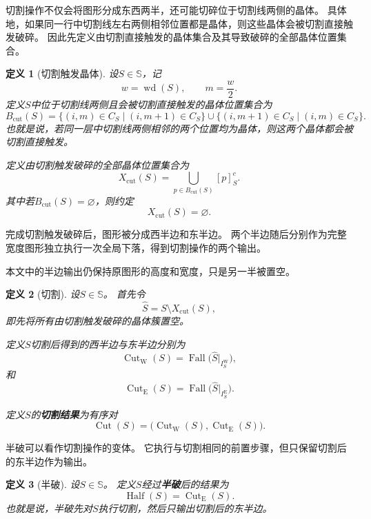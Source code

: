 \documentclass[UTF8,fontset=none]{ctexart}
\theoremstyle{cnthm}
\newtheorem{definition}{定义}[section]
\begin{document}
			切割操作不仅会将图形分成东西两半，还可能切碎位于切割线两侧的晶体。
			具体地，如果同一行中切割线左右两侧相邻位置都是晶体，则这些晶体会被切割直接触发破碎。
			因此先定义由切割直接触发的晶体集合及其导致破碎的全部晶体位置集合。
			
			\begin{definition}[切割触发晶体]
				设$S\in\mathbb{S}$，记
				$$
				w=\operatorname{wd}(S),
				\qquad
				m=\frac{w}{2}.
				$$
				定义$S$中位于切割线两侧且会被切割直接触发的晶体位置集合为
				$$
				B_{\mathrm{cut}}(S)
				=
				\{(i,m)\in C_S\mid (i,m+1)\in C_S\}
				\cup
				\{(i,m+1)\in C_S\mid (i,m)\in C_S\}.
				$$
				也就是说，若同一层中切割线两侧相邻的两个位置均为晶体，则这两个晶体都会被切割直接触发。
				
				定义由切割触发破碎的全部晶体位置集合为
				$$
				X_{\mathrm{cut}}(S)
				=
				\bigcup_{p\in B_{\mathrm{cut}}(S)} [p]^c_S.
				$$
				其中若$B_{\mathrm{cut}}(S)=\varnothing$，则约定
				$$
				X_{\mathrm{cut}}(S)=\varnothing.
				$$
			\end{definition}
			
			完成切割触发破碎后，图形被分成西半边和东半边。
			两个半边随后分别作为完整宽度图形独立执行一次全局下落，得到切割操作的两个输出。
			
			本文中的半边输出仍保持原图形的高度和宽度，只是另一半被置空。
			
			\begin{definition}[切割]
				设$S\in\mathbb{S}$。
				首先令
				$$
				\widehat{S}
				=
				S\setminus X_{\mathrm{cut}}(S),
				$$
				即先将所有由切割触发破碎的晶体簇置空。
				
				定义$S$切割后得到的西半边与东半边分别为
				$$
				\operatorname{Cut}_{\mathrm W}(S)
				=
				\operatorname{Fall}\bigl(\widehat{S}|_{I^{\mathrm W}_S}\bigr),
				$$
				和
				$$
				\operatorname{Cut}_{\mathrm E}(S)
				=
				\operatorname{Fall}\bigl(\widehat{S}|_{I^{\mathrm E}_S}\bigr).
				$$
				
				定义$S$的\textbf{切割结果}为有序对
				$$
				\operatorname{Cut}(S)
				=
				\bigl(
				\operatorname{Cut}_{\mathrm W}(S),
				\operatorname{Cut}_{\mathrm E}(S)
				\bigr).
				$$
			\end{definition}
			
			半破可以看作切割操作的变体。
			它执行与切割相同的前置步骤，但只保留切割后的东半边作为输出。
			
			\begin{definition}[半破]
				设$S\in\mathbb{S}$。
				定义$S$经过\textbf{半破}后的结果为
				$$
				\operatorname{Half}(S)
				=
				\operatorname{Cut}_{\mathrm E}(S).
				$$
				也就是说，半破先对$S$执行切割，然后只输出切割后的东半边。
			\end{definition}
			
\end{document}
